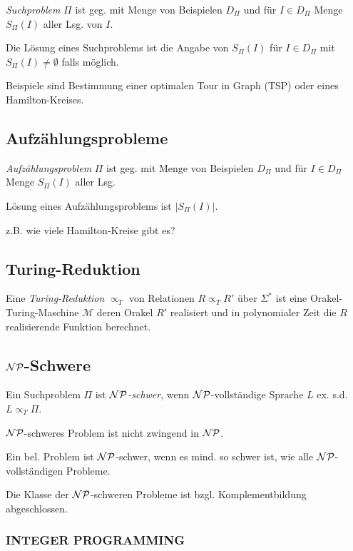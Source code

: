 \emph{Suchproblem} $\Pi$ ist geg. mit Menge von Beispielen $D_\Pi$ und für $I \in D_\Pi$ Menge $S_\Pi(I)$ aller Lsg. von $I$.

Die Lösung eines Suchproblems ist die Angabe von $S_\Pi(I)$ für $I \in D_\Pi$ mit $S_\Pi(I) \neq \emptyset$ falls möglich.

\spacing

Beispiele sind Bestimmung einer optimalen Tour in Graph (TSP) oder eines Hamilton-Kreises.

\subsection*{Aufzählungsprobleme}

\emph{Aufzählungsproblem} $\Pi$ ist geg. mit Menge von Beispielen $D_\Pi$ und für $I \in D_\Pi$ Menge $S_\Pi(I)$ aller Lsg.

Lösung eines Aufzählungsproblems ist $|S_\Pi(I)|$.

\spacing

z.B. wie viele Hamilton-Kreise gibt es?

\subsection*{Turing-Reduktion}

Eine \emph{Turing-Reduktion} $\propto_T$ von Relationen $R \propto_T R'$ über $\Sigma^*$ ist eine Orakel-Turing-Maschine $\mathcal{M}$ deren Orakel $R'$ realisiert und in polynomialer Zeit die $R$ realisierende Funktion berechnet.

\subsection*{$\mathcal{NP}$-Schwere}

Ein Suchproblem $\Pi$ ist \emph{$\mathcal{NP}$-schwer}, wenn $\mathcal{NP}$-vollständige Sprache $L$ ex. s.d. $L \propto_T \Pi$.

$\mathcal{NP}$-schweres Problem ist nicht zwingend in $\mathcal{NP}$.

Ein bel. Problem ist $\mathcal{NP}$-schwer, wenn es mind. so schwer ist, wie alle $\mathcal{NP}$-vollständigen Probleme.

\spacing

Die Klasse der $\mathcal{NP}$-schweren Probleme ist bzgl. Komplementbildung abgeschlossen.

\subsubsection*{INTEGER PROGRAMMING}

